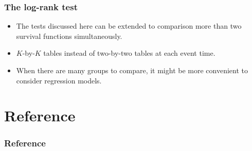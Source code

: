 \documentclass[10pt]{beamer}\usepackage[]{graphicx}\usepackage[]{color}
\begin{document}
\begin{frame}
  \frametitle{The log-rank test}
  \begin{itemize}
  \item The tests discussed here can be extended to comparison more than two survival functions simultaneously.
  \item $K$-by-$K$ tables instead of two-by-two tables at each event time.
  \item When there are many groups to compare, it might be more convenient to consider regression models.
  \end{itemize}
\end{frame}


\section{Reference}
\begin{frame}[shrink = 25]
\frametitle{Reference}
\begin{center}
\scriptsize


\end{center}
\end{frame}
\end{document}
